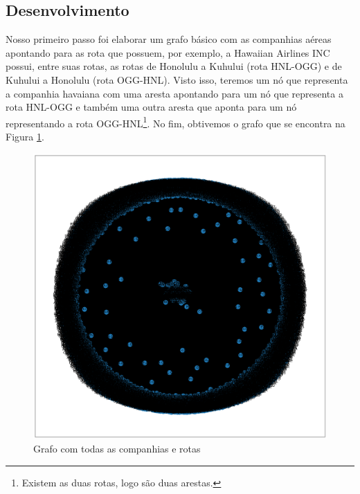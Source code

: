 \documentclass{article}
\begin{document}
\subsection{Desenvolvimento}

Nosso primeiro passo foi elaborar um grafo básico com as companhias aéreas apontando para as rota que possuem, por exemplo, a Hawaiian Airlines INC possui, entre suas rotas, as rotas de Honolulu a Kuhului (rota HNL-OGG) e de Kuhului a Honolulu (rota OGG-HNL). Visto isso, teremos um nó que representa a companhia havaiana com uma aresta apontando para um nó que representa a rota HNL-OGG e também uma outra aresta que aponta para um nó representando a rota OGG-HNL\footnote{Existem as duas rotas, logo são duas arestas.}. No fim, obtivemos o grafo que se encontra na Figura \ref{grafo}.
\begin{figure}
    \centering
    \includegraphics[scale = 0.3]{Imagens/graph.png}
    \caption{Grafo com todas as companhias e rotas}
    \label{grafo}
\end{figure}
\end{document}
